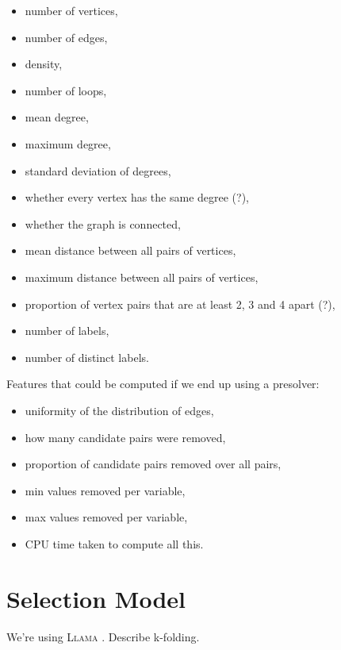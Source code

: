\documentclass{article}
\begin{document}
\begin{itemize}
\item number of vertices,
\item number of edges,
\item density,
\item number of loops,
\item mean degree,
\item maximum degree,
\item standard deviation of degrees,
\item whether every vertex has the same degree (?),
\item whether the graph is connected,
\item mean distance between all pairs of vertices,
\item maximum distance between all pairs of vertices,
\item proportion of vertex pairs that are at least 2, 3 and 4 apart (?),
\item number of labels,
\item number of distinct labels.
\end{itemize}

Features that could be computed if we end up using a presolver:

\begin{itemize}
\item uniformity of the distribution of edges,
\item how many candidate pairs were removed,
\item proportion of candidate pairs removed over all pairs,
\item min values removed per variable,
\item max values removed per variable,
\item CPU time taken to compute all this.
\end{itemize}

\section{Selection Model}
We're using \textsc{Llama} \cite{kotthoff_llama_2013}. Describe k-folding.

\printbibliography
\end{document}

